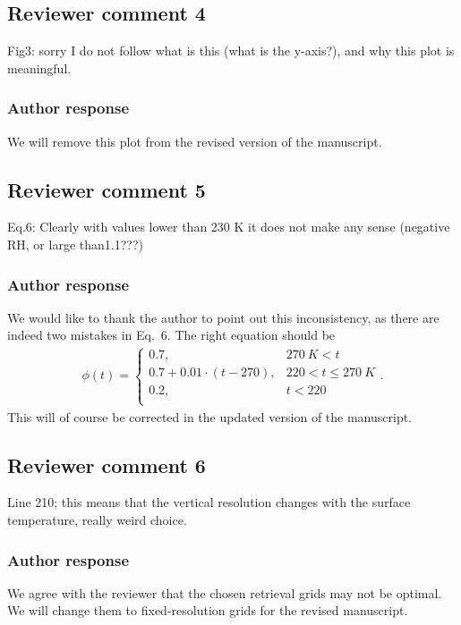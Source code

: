 \documentclass[11pt]{scrartcl}
\begin{document}
\subsection*{Reviewer comment 4}

Fig3: sorry I do not follow what is this (what is the y-axis?), and why this plot is meaningful.

\subsubsection*{Author response}

We will remove this plot from the revised version of the manuscript.


\subsection*{Reviewer comment 5}
Eq.6: Clearly with values lower than 230 K it does not make any sense (negative RH, or large than1.1???)

\subsubsection*{Author response}

We would like to thank the author to point out this inconsistency, as there are indeed two mistakes
in Eq.~6. The right equation should be
\begin{align}
\phi(t) = \begin{cases}
 0.7, & 270\ \unit{K} < t \\
 0.7 + 0.01 \cdot (t - 270), &220 < t \leq  270\ \unit{K} \\
 0.2,  & t < 220 \\
 \end{cases}.
\end{align}
This will of course be corrected in the updated version of the manuscript.

\subsection*{Reviewer comment 6}
Line 210; this means that the vertical resolution changes with the surface temperature, really weird choice.

\subsubsection*{Author response}

We agree with the reviewer that the chosen retrieval grids may not be optimal.
We will change them to fixed-resolution grids for the revised manuscript.
\end{document}
